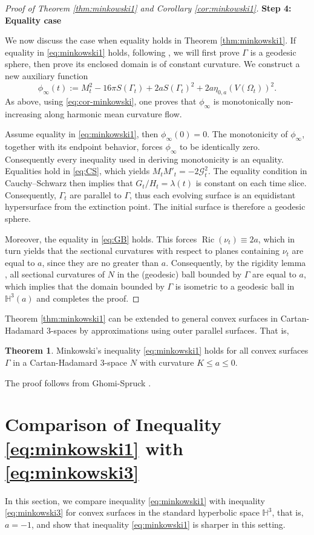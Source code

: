 \documentclass[11pt]{amsart}
\theoremstyle{definition}
\newcommand{\G}{\mathcal{G}}
\newcommand{\HH}{\mathbb{H}}
\newtheorem{thm}[prop]{Theorem}
\theoremstyle{remark}
\numberwithin{equation}{section}
\begin{document}
\begin{proof}[Proof of Theorem \ref{thm:minkowski1} and Corollary \ref{cor:minkowski1}]
	\textbf{Step 4: Equality case}
	
	We now discuss the case when equality holds in Theorem \ref{thm:minkowski1}. If equality in \eqref{eq:minkowski1} holds, following \cite{ghomi-spruck2023}, we will first prove $\Gamma$ is a geodesic sphere, then prove its enclosed domain is of constant curvature.
	We construct a new auxiliary function
	$$  \phi_{\infty}(t):= M_t^2 -  16\pi S(\Gamma_t) +2a S(\Gamma_t)^2 + 2a \eta_{0,a}(V(\Omega_t))^2. $$
	As above, using \eqref{eq:cor-minkowski}, one proves that $\phi_{\infty}$ is monotonically non-increasing along harmonic mean curvature flow. 
	
	Assume equality in \eqref{eq:minkowski1}, then $\phi_{\infty}(0)=0$. The monotonicity of \(\phi_\infty\), together with its endpoint behavior, forces \(\phi_\infty\) to be identically zero. Consequently every inequality used in deriving monotonicity is an equality. Equalities hold in \eqref{eq:CS}, which yields  $ M_t M'_t=-2\G_t^2$. The equality condition in Cauchy--Schwarz then implies that $G_t/H_t = \lambda(t)$ is constant on each time slice. Consequently, $\Gamma_t$ are parallel to $\Gamma$, thus each evolving surface is an equidistant hypersurface from the extinction point. The initial surface is therefore a geodesic sphere. 
	
	Moreover, the equality in \eqref{eq:GB} holds. This forces $\operatorname{Ric}(\nu_t)\equiv 2a$, which in turn yields that the sectional curvatures with respect to planes containing $\nu_t$ are equal to $a$, since they are no greater than $a$. Consequently, by the rigidity lemma \cite[Lem. 5.4]{ghomi-spruck2022}, all sectional curvatures of $N$ in the (geodesic) ball bounded by $\Gamma$ are equal to $a$, which implies that the domain bounded by $\Gamma$ is isometric to a geodesic ball in $\HH^3(a)$ and completes the proof.
\end{proof}
	
	Theorem \ref{thm:minkowski1} can be extended to general convex surfaces in Cartan-Hadamard 3-spaces by approximations using outer parallel surfaces. That is,
	\begin{thm}\label{thm:minkowski1-convex}
		Minkowski's inequality \eqref{eq:minkowski1} holds for all convex surfaces $\Gamma$ in a Cartan-Hadamard $3$-space $N$ with curvature $K\leq a\leq 0$.
	\end{thm}
	The proof follows from Ghomi-Spruck \cite[Section 3]{ghomi-spruck2023}.
	
	\section{Comparison of Inequality \eqref{eq:minkowski1} with \eqref{eq:minkowski3}} \label{sec:4}
		In this section, we compare inequality \eqref{eq:minkowski1} with inequality \eqref{eq:minkowski3} for convex surfaces in the standard hyperbolic space $\HH^3$, that is, $a=-1$, and show that inequality \eqref{eq:minkowski1} is sharper in this setting.
		
\end{document}
